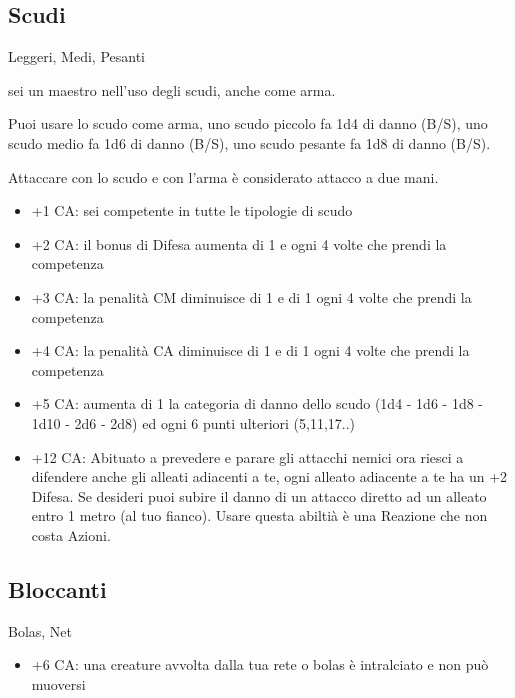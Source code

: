 \documentclass[a4paper,11pt,twoside,openany]{book}
\begin{document}
\subsection{Scudi} Leggeri, Medi, Pesanti

sei un maestro nell'uso degli scudi, anche come arma.

Puoi usare lo scudo come arma, uno scudo piccolo fa 1d4 di danno (B/S), uno scudo medio fa 1d6 di danno (B/S), uno scudo pesante fa 1d8 di danno (B/S).

Attaccare con lo scudo e con l'arma è considerato attacco a due mani.

\begin{itemize}
	\item +1 CA: sei competente in tutte le tipologie di scudo

	\item +2 CA: il bonus di Difesa aumenta di 1 e ogni 4 volte che prendi la competenza

	\item +3 CA: la penalità CM diminuisce di 1 e di 1 ogni 4 volte che prendi la competenza

	\item +4 CA: la penalità CA diminuisce di 1 e di 1 ogni 4 volte che prendi la competenza

	\item +5 CA: aumenta di 1 la categoria di danno dello scudo (1d4 - 1d6 - 1d8 - 1d10 - 2d6 - 2d8) ed ogni 6 punti ulteriori (5,11,17..)

	\item +12 CA: Abituato a prevedere e parare gli attacchi nemici ora riesci a difendere anche gli alleati adiacenti a te, ogni alleato adiacente a te ha un +2 Difesa. Se desideri puoi subire il danno di un attacco diretto ad un alleato entro 1 metro (al tuo fianco). Usare questa abiltià è una Reazione che non costa Azioni.

\end{itemize}

\subsection{Bloccanti} Bolas, Net

\begin{itemize}
	\item +6 CA: una creature avvolta dalla tua rete o bolas è intralciato
	      e non può muoversi

\end{itemize}
\end{document}
